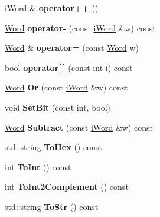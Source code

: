 \begin{DoxyCompactItemize}
\item 
\hypertarget{classWord_a3837f49bcb44597e6d738ccb0eeed144}{
\hyperlink{classiWord}{iWord} \& {\bfseries operator++} ()}
\label{classWord_a3837f49bcb44597e6d738ccb0eeed144}

\item 
\hypertarget{classWord_af930dcccdcf2cdbb90df31ac61a4933c}{
\hyperlink{classWord}{Word} {\bfseries operator-\/} (const \hyperlink{classiWord}{iWord} \&w) const }
\label{classWord_af930dcccdcf2cdbb90df31ac61a4933c}

\item 
\hypertarget{classWord_a2a3d8ab2639aada7a1aafcd3acd3900f}{
\hyperlink{classWord}{Word} \& {\bfseries operator=} (const \hyperlink{classWord}{Word} w)}
\label{classWord_a2a3d8ab2639aada7a1aafcd3acd3900f}

\item 
\hypertarget{classWord_a0b08a81ced05b38d3d719ef70ecb3215}{
bool {\bfseries operator\mbox{[}$\,$\mbox{]}} (const int i) const }
\label{classWord_a0b08a81ced05b38d3d719ef70ecb3215}

\item 
\hypertarget{classWord_a681da292897265ae47f144a99d49d9ec}{
\hyperlink{classWord}{Word} {\bfseries Or} (const \hyperlink{classiWord}{iWord} \&w) const }
\label{classWord_a681da292897265ae47f144a99d49d9ec}

\item 
\hypertarget{classWord_a8449f26fb840ca22dcc2ba3fc816d068}{
void {\bfseries SetBit} (const int, bool)}
\label{classWord_a8449f26fb840ca22dcc2ba3fc816d068}

\item 
\hypertarget{classWord_aef1af160cdcc631473aec52ea883e2e5}{
\hyperlink{classWord}{Word} {\bfseries Subtract} (const \hyperlink{classiWord}{iWord} \&w) const }
\label{classWord_aef1af160cdcc631473aec52ea883e2e5}

\item 
\hypertarget{classWord_af71af6fa290db8e9b4719c2b95ba9af0}{
std::string {\bfseries ToHex} () const }
\label{classWord_af71af6fa290db8e9b4719c2b95ba9af0}

\item 
\hypertarget{classWord_acf9a6c3d9cf07d66da592ec76f572464}{
int {\bfseries ToInt} () const }
\label{classWord_acf9a6c3d9cf07d66da592ec76f572464}

\item 
\hypertarget{classWord_a4116e08d36472a287c06a4aa14e7ed4f}{
int {\bfseries ToInt2Complement} () const }
\label{classWord_a4116e08d36472a287c06a4aa14e7ed4f}

\item 
\hypertarget{classWord_a5f8c5dcdb847ed96021ef9282ccc7e76}{
std::string {\bfseries ToStr} () const }
\label{classWord_a5f8c5dcdb847ed96021ef9282ccc7e76}

\end{DoxyCompactItemize}
